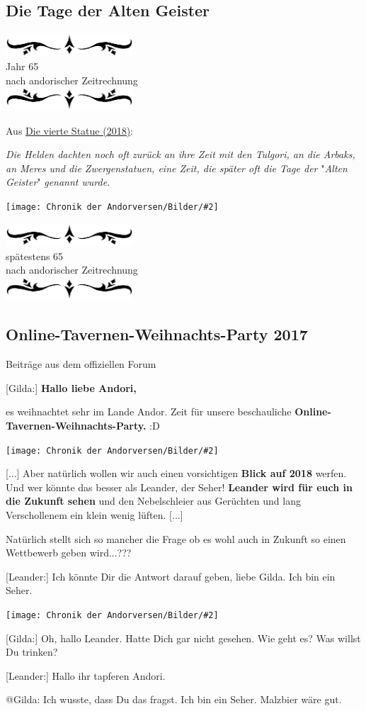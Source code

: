 \documentclass[10pt, a4paper, oneside]{book}
\newcommand{\fillbreak}{\vspace*{\fill}\columnbreak}
\newcommand{\storytext}[1]{%
    \section{#1}%
    \label{Storytext: #1}%
}
\newcommand{\reflegende}[1]{\hyperref[Legende: #1]{#1}}
\newcommand{\bildmitts}[2][height=0.32\textwidth,width=0.48\textwidth,keepaspectratio]{%
    \begin{center}
        \texttt{[image: Chronik der Andorversen/Bilder/\#2]}
    \end{center}
}
\newcommand{\az}[1]{%
    \begin{center}
        \includegraphics[width=180px]{Chronik der Andorversen/verzierung1.png}\\
        {\Huge #1} \\
        {nach andorischer Zeitrechnung}\\
        \includegraphics[width=180px]{Chronik der Andorversen/verzierung2.png}
    \end{center}
    \extramarks{}{#1 a.Z.}
}
\begin{document}
\begin{multicols}{2}
\begin{chapterbox}
    \chapter{Die Tage der Alten Geister}


    \az{Jahr 65}

    \begin{center}
        Aus \reflegende{Die vierte Statue (2018)}:
    \end{center}


    \textit{Die Helden dachten noch oft zurück an ihre Zeit mit den Tulgori, an die Arbaks, an Meres und die Zwergenstatuen, eine Zeit, die später oft die Tage der} "\textit{Alten Geister}"\textit{ genannt wurde.}


    \bildmitts[width=\textwidth]{Launische Waldgeister.jpg}


\end{chapterbox}



\fillbreak
\az{spätestens 65}
\storytext{Online-Tavernen-Weihnachts-Party 2017}

\begin{center}
    Beiträge aus dem offiziellen Forum
\end{center}


[Gilda:] \textbf{Hallo liebe Andori,}

es weihnachtet sehr im Lande Andor. Zeit für unsere beschauliche \textbf{Online-Tavernen-Weihnachts-Party.} :D

\bildmitts{Online-Tavernen-Weihnachts-Party 2017.jpeg}

[...] Aber natürlich wollen wir auch einen vorsichtigen \textbf{Blick auf 2018} werfen. Und wer könnte das besser als Leander, der Seher!
\textbf{Leander wird für euch in die Zukunft sehen} und den Nebelschleier aus Gerüchten und lang Verschollenem ein klein wenig lüften. [...]

Natürlich stellt sich so mancher die Frage ob es wohl auch in Zukunft so einen Wettbewerb geben wird...???

[Leander:] Ich könnte Dir die Antwort darauf geben, liebe Gilda. Ich bin ein Seher.

\bildmitts{Online-Tavernen-Weihnachts-Party 2017 1.jpeg}

[Gilda:] Oh, hallo Leander. Hatte Dich gar nicht gesehen. Wie geht es? Was willst Du trinken?

[Leander:] Hallo ihr tapferen Andori.

@Gilda: Ich wusste, dass Du das fragst. Ich bin ein Seher. Malzbier wäre gut.


\end{multicols}
\end{document}
